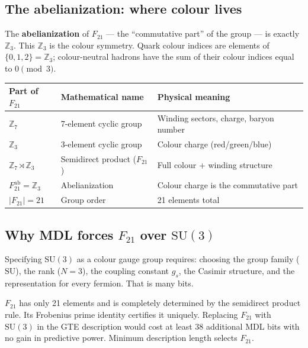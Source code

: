 \documentclass[11pt,a4paper]{article}
\newcommand{\term}[1]{\textbf{#1}}
\begin{document}
\subsection{The abelianization: where colour lives}

The \term{abelianization} of $F_{21}$ --- the ``commutative part'' of the group --- is exactly $\mathbb{Z}_3$.  This $\mathbb{Z}_3$ is the colour symmetry.  Quark colour indices are elements of $\{0, 1, 2\} = \mathbb{Z}_3$; colour-neutral hadrons have the sum of their colour indices equal to $0 \pmod{3}$.

\begin{tcolorbox}[colback=boxyellow,colframe=yellow!60!black,title=Summary of the group structure]
\begin{center}
\begin{tabular}{lll}
\toprule
Part of $F_{21}$ & Mathematical name & Physical meaning \\
\midrule
$\mathbb{Z}_7$ & 7-element cyclic group & Winding sectors, charge, baryon number \\
$\mathbb{Z}_3$ & 3-element cyclic group & Colour charge (red/green/blue) \\
$\mathbb{Z}_7 \rtimes \mathbb{Z}_3$ & Semidirect product ($F_{21}$) & Full colour + winding structure \\
$F_{21}^{\mathrm{ab}} = \mathbb{Z}_3$ & Abelianization & Colour charge is the commutative part \\
$|F_{21}| = 21$ & Group order & 21 elements total \\
\bottomrule
\end{tabular}
\end{center}
\end{tcolorbox}

\subsection{Why MDL forces $F_{21}$ over $\mathrm{SU}(3)$}

Specifying $\mathrm{SU}(3)$ as a colour gauge group requires: choosing the group family ($\mathrm{SU}$), the rank ($N = 3$), the coupling constant $g_s$, the Casimir structure, and the representation for every fermion.  That is many bits.

$F_{21}$ has only 21 elements and is completely determined by the semidirect product rule.  Its Frobenius prime identity certifies it uniquely.  Replacing $F_{21}$ with $\mathrm{SU}(3)$ in the GTE description would cost at least 38 additional MDL bits with no gain in predictive power.  Minimum description length selects $F_{21}$.
\end{document}
